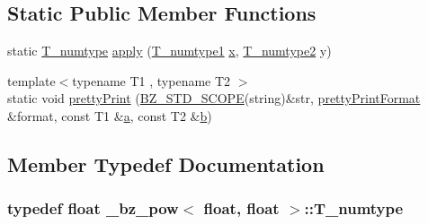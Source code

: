 \subsection*{Static Public Member Functions}
\begin{DoxyCompactItemize}
\item 
static \hyperlink{class__bz__pow_3_01float_00_01float_01_4_ac1fa1c38bfd853ffb73fb86b486ee82e}{T\+\_\+numtype} \hyperlink{class__bz__pow_3_01float_00_01float_01_4_a270c178c609528fa64b0a13cf7c6313a}{apply} (\hyperlink{class__bz__pow_3_01float_00_01float_01_4_aaf9b305e9f6eaa2592d8fdf882868257}{T\+\_\+numtype1} \hyperlink{vecnorm1_8cc_ac73eed9e41ec09d58f112f06c2d6cb63}{x}, \hyperlink{class__bz__pow_3_01float_00_01float_01_4_aee0d61f645f0363bce496c1f3118f4fb}{T\+\_\+numtype2} y)
\item 
{\footnotesize template$<$typename T1 , typename T2 $>$ }\\static void \hyperlink{class__bz__pow_3_01float_00_01float_01_4_a2561d8d2af62eb6ca0fe5dcf63b5d6f8}{pretty\+Print} (\hyperlink{numinquire_8h_a2b24ffc3b4ef9803956bc7715c6c7b83}{B\+Z\+\_\+\+S\+T\+D\+\_\+\+S\+C\+O\+P\+E}(string)\&str, \hyperlink{classprettyPrintFormat}{pretty\+Print\+Format} \&format, const T1 \&\hyperlink{gen__mat5files_8m_aae328bf20413f220e38aec4d95bfd6da}{a}, const T2 \&\hyperlink{gen__mat5files_8m_a7b38767b3b6a8dae167e5afa4fc340b0}{b})
\end{DoxyCompactItemize}


\subsection{Member Typedef Documentation}
\hypertarget{class__bz__pow_3_01float_00_01float_01_4_ac1fa1c38bfd853ffb73fb86b486ee82e}{}
\subsubsection[{T\+\_\+numtype}]{\setlength{\rightskip}{0pt plus 5cm}typedef float {\bf \+\_\+bz\+\_\+pow}$<$ float, float $>$\+::{\bf T\+\_\+numtype}}\label{class__bz__pow_3_01float_00_01float_01_4_ac1fa1c38bfd853ffb73fb86b486ee82e}
\hypertarget{class__bz__pow_3_01float_00_01float_01_4_aaf9b305e9f6eaa2592d8fdf882868257}{}
